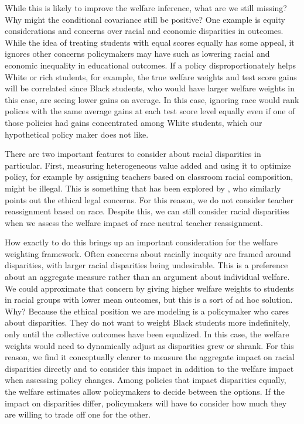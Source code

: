 \documentclass[12pt]{article}
\theoremstyle{definition}
\theoremstyle{definition}
\theoremstyle{definition}
\theoremstyle{definition}
\begin{document}
    
    While this is likely to improve the welfare inference, what are we still missing? Why might the conditional covariance still be positive? One example is equity considerations and concerns over racial and economic disparities in outcomes. While the idea of treating students with equal scores equally has some appeal, it ignores other concerns policymakers may have such as lowering racial and economic inequality in educational outcomes. If a policy disproportionately helps White or rich students, for example, the true welfare weights and test score gains will be correlated since Black students, who would have larger welfare weights in this case, are seeing lower gains on average. In this case, ignoring race would rank polices with the same average gains at each test score level equally even if one of those policies had gains concentrated among White students, which our hypothetical policy maker does not like.

    There are two important features to consider about racial disparities in particular. First, measuring heterogeneous value added and using it to optimize policy, for example by assigning teachers based on classroom racial composition, might be illegal. This is something that has been explored by \citet{Delgado2020}, who similarly points out the ethical legal concerns. For this reason, we do not consider teacher reassignment based on race. Despite this, we can still consider racial disparities when we assess the welfare impact of race neutral teacher reassignment. 
    
    How exactly to do this brings up an important consideration for the welfare weighting framework. Often concerns about racially inequity are framed around disparities, with larger racial disparities being undesirable. This is a preference about an aggregate measure rather than an argument about individual welfare. We could approximate that concern by giving higher welfare weights to students in racial groups with lower mean outcomes, but this is a sort of ad hoc solution. Why? Because the ethical position we are modeling is a policymaker who cares about disparities. They do not want to weight Black students more indefinitely, only until the collective outcomes have been equalized. In this case, the welfare weights would need to dynamically adjust as disparities grew or shrank. For this reason, we find it conceptually clearer to measure the aggregate impact on racial disparities directly and to consider this impact in addition to the welfare impact when assessing policy changes. Among policies that impact disparities equally, the welfare estimates allow policymakers to decide between the options. If the impact on disparities differ, policymakers will have to consider how much they are willing to trade off one for the other.      
\end{document}

